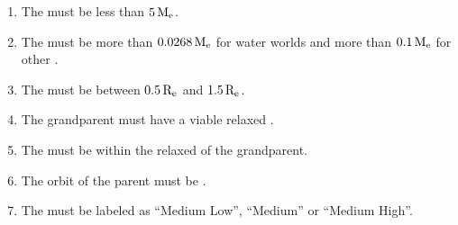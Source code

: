 \documentclass[letterpaper,10pt,english]{sphinxmanual}
\begin{document}
\begin{enumerate}
%
\item {} 
\sphinxAtStartPar
The {\hyperref[\detokenize{quantities/material/mass:id1}]{}} must be less than \(5 \, {\rm M_e}\).

\item {} 
\sphinxAtStartPar
The {\hyperref[\detokenize{quantities/material/mass:id1}]{}} must be more than \(0.0268 \, {\rm M_e}\) for water worlds and more than \(0.1 \, {\rm M_e}\) for other {\hyperref[\detokenize{quantities/material/composition_type:id1}]{}}.

\item {} 
\sphinxAtStartPar
The {\hyperref[\detokenize{quantities/geometric/radius:id1}]{}} must be between \(0.5 \, {\rm R_e}\) and \(1.5 \, {\rm R_e}\).

\item {} 
\sphinxAtStartPar
The {\hyperref[\detokenize{celestial_bodies/trojan_satellite:id1}]{}} grandparent must have a viable relaxed {\hyperref[\detokenize{quantities/habitability/habitable_zones/habitable_zones:id1}]{}}.

\item {} 
\sphinxAtStartPar
The {\hyperref[\detokenize{quantities/orbital/semi_major_axis:id1}]{}} must be within the relaxed {\hyperref[\detokenize{quantities/habitability/habitable_zones/habitable_zones:id1}]{}} of the grandparent.

\item {} 
\sphinxAtStartPar
The orbit of the parent must be {\hyperref[\detokenize{quantities/orbital/orbital_stability:id1}]{}}.

\item {} 
\sphinxAtStartPar
The {\hyperref[\detokenize{quantities/surface/internal_heating/tectonic_activity:id1}]{}} must be labeled as “Medium Low”, “Medium” or “Medium High”.

\end{enumerate}



\renewcommand{\indexname}{Index}
\printindex
\end{document}

